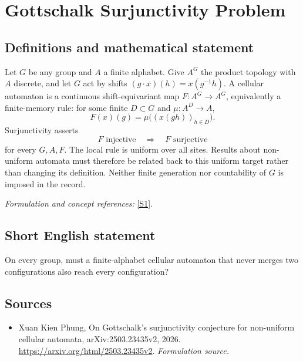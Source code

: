 \documentclass[11pt]{article}
\begin{document}
\section*{\texorpdfstring{Gottschalk Surjunctivity Problem}{Gottschalk Surjunctivity Problem}}\label{30002424}
\subsection{Definitions and mathematical statement}
Let $G$ be any group and $A$ a finite alphabet. Give $A^G$ the product topology with $A$ discrete, and let $G$ act by shifts $(g\cdot x)(h)=x(g^{-1}h)$. A cellular automaton is a continuous shift-equivariant map $F:A^G\to A^G$, equivalently a finite-memory rule: for some finite $D\subset G$ and $\mu:A^D\to A$,
\[
 F(x)(g)=\mu\bigl((x(gh))_{h\in D}\bigr).
\]
Surjunctivity asserts
\[
 F\text{ injective}\quad\Longrightarrow\quad F\text{ surjective}
\]
for every $G,A,F$. The local rule is uniform over all sites. Results about non-uniform automata must therefore be related back to this uniform target rather than changing its definition. Neither finite generation nor countability of $G$ is imposed in the record.
\par\smallskip\textit{Formulation and concept references:} \href{https://arxiv.org/html/2503.23435v2}{[S1]}.

\subsection{Short English statement}
On every group, must a finite-alphabet cellular automaton that never merges two configurations also reach every configuration?
\subsection{Sources}
\begin{itemize}
\item[S1]Xuan Kien Phung, On Gottschalk's surjunctivity conjecture for non-uniform cellular automata, arXiv:2503.23435v2, 2026.
\url{https://arxiv.org/html/2503.23435v2}.
\textit{Formulation source.}
\end{itemize}
\end{document}
